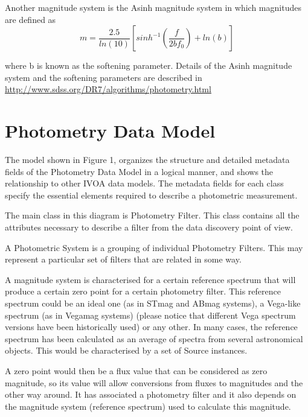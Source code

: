 \documentclass[11pt,a4paper]{ivoa}
\begin{document}
Another magnitude system is the Asinh magnitude system in which magnitudes 
are defined as
\begin{equation} \label{eq:13}
m = \frac{2.5}{ln(10)} \left[ sinh^{-1}(\frac{f}{2bf_0}) +ln(b) \right]
\end{equation}


where b is known as the softening parameter. Details of the Asinh magnitude 
system and the softening parameters are described in 
\url{http://www.sdss.org/DR7/algorithms/photometry.html}
\par

\section{Photometry Data Model} \label{datamodel}
The model shown in Figure 1, organizes the structure and detailed metadata 
fields of the Photometry Data Model in a logical manner, and shows the 
relationship to other IVOA data models. The metadata fields for each class 
specify the essential elements required to describe a photometric measurement.
\par

The main class in this diagram is Photometry Filter. This class contains 
all the attributes necessary to describe a filter from the data discovery 
point of view.
\par

A Photometric System is a grouping of individual Photometry Filters. This may 
represent a particular set of filters that are related in some way.
\par

A magnitude system is characterised for a certain reference spectrum that 
will produce a certain zero point for a certain photometry filter. This 
reference spectrum could be an ideal one (as in STmag and ABmag systems), a 
Vega-like spectrum (as in Vegamag systems) (please notice that different Vega 
spectrum versions have been historically used) or any other. In many cases, 
the reference spectrum has been calculated as an average of spectra from several 
astronomical objects. This would be characterised by a set of Source instances.
\par

A zero point would then be a flux value that can be considered as zero 
magnitude, so its value will allow conversions from fluxes to magnitudes 
and the other way around. It has associated a photometry filter and it also 
depends on the magnitude system (reference spectrum) used to calculate this 
magnitude.
\par
\end{document}
